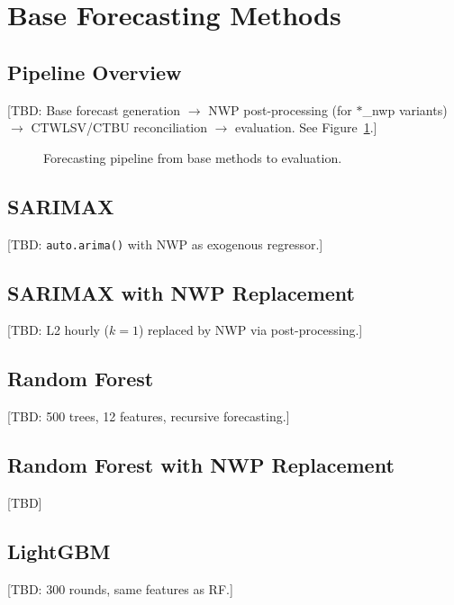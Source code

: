 \section{Base Forecasting Methods}\label{sec:base-methods}

\subsection{Pipeline Overview}\label{sec:pipeline}

[TBD: Base forecast generation $\rightarrow$ NWP post-processing (for $*$\_nwp variants) $\rightarrow$ CTWLSV/CTBU reconciliation $\rightarrow$ evaluation. See Figure~\ref{fig:pipeline}.]

\begin{figure}[htbp]
    \centering
    \caption{Forecasting pipeline from base methods to evaluation.}
    \label{fig:pipeline}
\end{figure}

\subsection{SARIMAX}\label{sec:method-sarimax}
[TBD: \texttt{auto.arima()} with NWP as exogenous regressor.]

\subsection{SARIMAX with NWP Replacement}\label{sec:method-sarimax-nwp}
[TBD: L2 hourly ($k=1$) replaced by NWP via post-processing.]

\subsection{Random Forest}\label{sec:method-rf}
[TBD: 500 trees, 12 features, recursive forecasting.]

\subsection{Random Forest with NWP Replacement}\label{sec:method-rf-nwp}
[TBD]

\subsection{LightGBM}\label{sec:method-lgbm}
[TBD: 300 rounds, same features as RF.]


